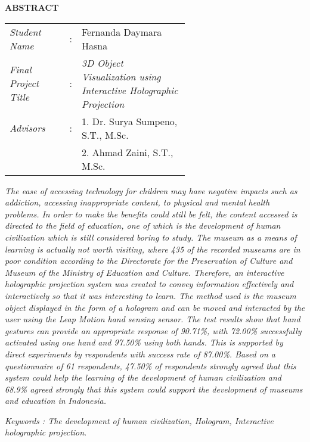\begin{center}
\Large\textbf{ABSTRACT}
\end{center}
\vspace{1ex}

\begin{adjustwidth}{-0.2cm}{}
\begin{tabular}{lcp{0.6\linewidth}}
	\textit{Student Name} &:& Fernanda Daymara Hasna \\
	\textit{Final Project Title} &:& \textit{3D Object Visualization using Interactive Holographic Projection} \\
	\textit{Advisors} &:& 1. Dr. Surya Sumpeno, S.T., M.Sc. \\
	& & 2. Ahmad Zaini, S.T., M.Sc.  \\
\end{tabular}
\end{adjustwidth}
\vspace{1ex}

\setlength{\parindent}{0cm} \textit{The ease of accessing technology for children may have negative impacts such as addiction, accessing inappropriate content, to physical and mental health problems\cite{sundus2018impact}. In order to make the benefits could still be felt, the content accessed is directed to the field of education, one of which is the development of human civilization which is still considered boring to study\cite{wirawan_2018}. The museum as a means of learning is actually not worth visiting, where 435 of the recorded museums are in poor condition according to the Directorate for the Preservation of Culture and Museum of the Ministry of Education and Culture\cite{kemendikbud_2019}. Therefore, an interactive holographic projection system was created to convey information effectively and interactively so that it was interesting to learn. The method used is the museum object displayed in the form of a hologram and can be moved and interacted by the user using the Leap Motion hand sensing sensor. The test results show that hand gestures can provide an appropriate response of 90.71\%, with 72.00\% successfully activated using one hand and 97.50\% using both hands. This is supported by direct experiments by respondents with success rate of 87.00\%. Based on a questionnaire of 61 respondents, 47.50\% of respondents strongly agreed that this system could help the learning of the development of human civilization and 68.9\% agreed strongly that this system could support the development of museums and education in Indonesia.}
\vspace{2ex}
	
\textit{Keywords : The development of human civilization, Hologram, Interactive holographic projection}.
\newpage

